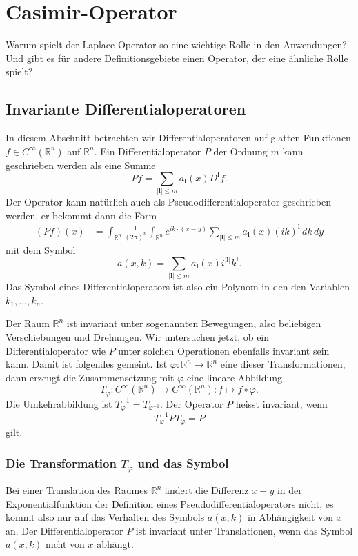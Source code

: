 %
%
%
\section{Casimir-Operator
\label{buch:operatoren:section:casimir}}
Warum spielt der Laplace-Operator so eine wichtige Rolle in den
Anwendungen?
Und gibt es für andere Definitionsgebiete einen Operator, der eine
ähnliche Rolle spielt?

%
%
\subsection{Invariante Differentialoperatoren}
In diesem Abschnitt betrachten wir Differentialoperatoren auf
glatten Funktionen $f\in C^\infty(\mathbb{R}^n)$ auf $\mathbb{R}^n$.
Ein Differentialoperator $P$ der Ordnung $m$ kann geschrieben werden als
eine Summe
\[
Pf
=
\sum_{|\mathbf{l}|\le m}
a_{\bm{l}}(x)
D^{\bm{l}}
f.
\]
Der Operator kann natürlich auch als Pseudodifferentialoperator geschrieben
werden, er bekommt dann die Form
\begin{align*}
(Pf)(x)
&=
\int_{\mathbb{R}^n}
\frac{1}{(2\pi)^n}
\int_{\mathbb{R}^n}
e^{ik\cdot (x-y)}
\sum_{|\bm{l}|\le m}
a_{\bm{l}}(x)(ik)^{\bm{l}}
\,dk
\,dy
\end{align*}
mit dem Symbol
\[
a(x,k)
=
\sum_{|\bm{l}|\le m} a_{\bm{l}}(x) i^{|\bm{l}|} k^{\bm{l}}.
\]
Das Symbol eines Differentialoperators ist also ein Polynom in den
den Variablen $k_1,\dots,k_n$.

Der Raum $\mathbb{R}^n$ ist invariant unter sogenannten Bewegungen, also
beliebigen Verschiebungen und Drehungen.
Wir untersuchen jetzt, ob ein Differentialoperator wie $P$ unter solchen
Operationen ebenfalls invariant sein kann.
Damit ist folgendes gemeint.
Ist $\varphi\colon\mathbb{R}^n\to\mathbb{R}^n$ eine dieser Transformationen,
dann erzeugt die Zusammensetzung mit $\varphi$ eine lineare Abbildung
\[
T_\varphi
\colon
C^{\infty}(\mathbb{R}^n) \to C^\infty(\mathbb{R}^n)
:
f \mapsto f\circ \varphi.
\]
Die Umkehrabbildung ist $T_\varphi^{-1}=T_{\varphi^{-1}}$.
Der Operator $P$ heisst invariant, wenn 
\[
T_\varphi^{-1} P T_\varphi = P
\]
gilt.

%
%
\subsubsection{Die Transformation $T_\varphi$ und das Symbol}
Bei einer Translation des Raumes $\mathbb{R}^n$ ändert die Differenz
$x-y$ in der Exponentialfunktion der Definition eines
Pseudodifferentialoperators nicht, es kommt also nur auf das Verhalten
des Symbols $a(x,k)$ in Abhängigkeit von $x$ an.
Der Differentialoperator $P$ ist invariant unter Translationen,
wenn das Symbol $a(x,k)$ nicht von $x$ abhängt.

